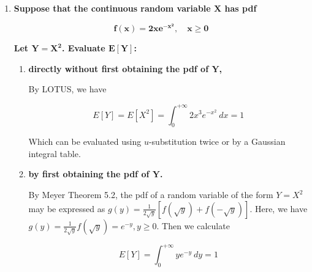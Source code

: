 \documentclass[10pt, oneside]{article}
\begin{document}
\begin{enumerate}[label=7.\arabic*]
  Making use of the fact that $\int \frac{1}{(1+x)^2} \ dx = \tan^{-1} x + C$. Now, we must invoke the notion that the expectation's additive property, namely that the expectation of a sum of random variables is the sum of the expectations of the constituent variables. Let $X_i$ be the number of points won on the $i$-th shot. Then let $Y$ be the total number of points won after 5 shots, or $Y = \sum^5_{i=1} X_i$. Since the distribution of outcomes for each $X_i$ are identical to one another, we have $E[X_i] = E[X_j]$ for each $i, j = 1,...,5$. For any $i$, $E[X_i] = 4(1/3)+3(1/6)+2(1/6) = 13/6$. Then $E[Y] = 5 \cdot 13/6 = \boxed{65/6}$.
  
\item  \begin{tcolorbox}[
  colback=Cerulean!5!white,
  colframe=Cerulean!75!black]
  \textbf{Suppose that the continuous random variable $\bm{X}$ has pdf}
  
  \[ \bm{f(x) = 2xe^{-x^2}, \quad x \geq 0} \]
  
  \textbf{Let $\bm{Y = X^2}$. Evaluate $\bm{E[Y]}$:}
  \end{tcolorbox}
  
	\begin{enumerate}
	\item  \begin{tcolorbox}[
	  colback=Cerulean!5!white,
	  colframe=Cerulean!75!black]
	  \textbf{directly without first obtaining the pdf of $\bm{Y}$,}
	  \end{tcolorbox}
	  
	  By LOTUS, we have
	  
	  \[ E[Y] = E[X^2] = \int^{+\infty}_0 2x^3 e^{-x^2} \ dx = \boxed{1} \] 
	  
	  Which can be evaluated using $u$-substitution twice or by a Gaussian integral table. 
	  
	\item  \begin{tcolorbox}[
	  colback=Cerulean!5!white,
	  colframe=Cerulean!75!black]
	  \textbf{by first obtaining the pdf of $\bm{Y}$.}
	  \end{tcolorbox}
	  
	  By Meyer Theorem 5.2, the pdf of a random variable of the form $Y = X^2$ may be expressed as $g(y) = \frac{1}{2 \sqrt{y}} [f(\sqrt{y}) + f(-\sqrt{y})]$. Here, we have $g(y) = \frac{1}{2 \sqrt{y}} f(\sqrt{y}) = e^{-y}, y \geq 0$. Then we calculate
	  
	  \[ E[Y] = \int^{+\infty}_0 ye^{-y} \ dy = \boxed{1} \]
	\end{enumerate}


\end{enumerate}
\end{document}
